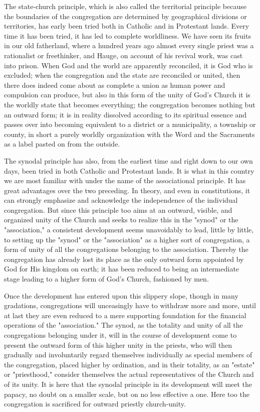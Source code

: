 The state-church principle, which is also called the territorial principle because the boundaries of the congregation are determined by geographical divisions or territories, has early been tried both in Catholic and in Protestant lands. Every time it has been tried, it has led to complete worldliness. We have seen its fruits in our old fatherland, where a hundred years ago almost every single priest was a rationalist or freethinker, and Hauge, on account of his revival work, was cast into prison. When God and the world are apparently reconciled, it is God who is excluded; when the congregation and the state are reconciled or united, then there does indeed come about as complete a union as human power and compulsion can produce, but also in this form of the unity of God’s Church it is the worldly state that becomes everything; the congregation becomes nothing but an outward form; it is in reality dissolved according to its spiritual essence and passes over into becoming equivalent to a district or a municipality, a township or county, in short a purely worldly organization with the Word and the Sacraments as a label pasted on from the outside.

The synodal principle has also, from the earliest time and right down to our own days, been tried in both Catholic and Protestant lands. It is what in this country we are most familiar with under the name of the associational principle. It has great advantages over the two preceding. In theory, and even in constitutions, it can strongly emphasize and acknowledge the independence of the individual congregation. But since this principle too aims at an outward, visible, and organized unity of the Church and seeks to realize this in the "synod" or the "association," a consistent development seems unavoidably to lead, little by little, to setting up the "synod" or the "association" as a higher sort of congregation, a form of unity of all the congregations belonging to the association. Thereby the congregation has already lost its place as the only outward form appointed by God for His kingdom on earth; it has been reduced to being an intermediate stage leading to a higher form of God’s Church, fashioned by men.

Once the development has entered upon this slippery slope, though in many gradations, congregations will unceasingly have to withdraw more and more, until at last they are even reduced to a mere supporting foundation for the financial operations of the "association." The synod, as the totality and unity of all the congregations belonging under it, will in the course of development come to present the outward form of this higher unity in the priests, who will then gradually and involuntarily regard themselves individually as special members of the congregation, placed higher by ordination, and in their totality, as an "estate" or "priesthood," consider themselves the actual representatives of the Church and of its unity. It is here that the synodal principle in its development will meet the papacy, no doubt on a smaller scale, but on no less effective a one. Here too the congregation is sacrificed for outward priestly church-unity.

